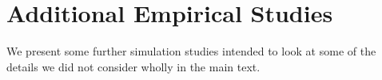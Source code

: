 \documentclass[11pt]{article}
\newcommand{\eps}{\varepsilon}
\newcommand{\vb}{v_b}
\newcommand{\vbeta}{v_\beta}
\newcommand{\postCov}{\Sigma_*}
\numberwithin{equation}{section}
\begin{document}

\section{Additional Empirical Studies}
We present some further simulation studies intended to look at some of the details we did not consider wholly in the main text. 
\end{document}
